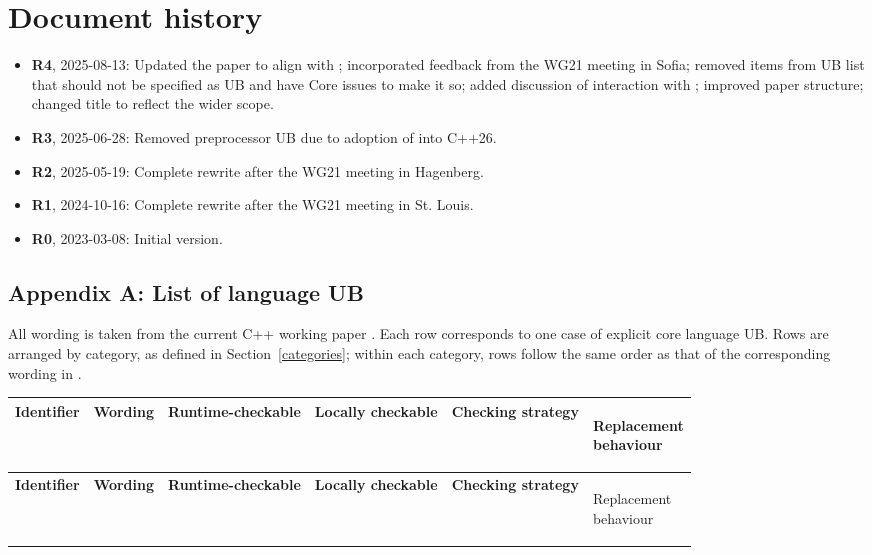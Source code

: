 {\section*{Document history}
\begin{itemize}
\item \textbf{R4}, 2025-08-13: Updated the paper to align with \cite{P3754R0}; incorporated feedback from the WG21 meeting in Sofia; removed items from UB list that should not be specified as UB and have Core issues to make it so; added discussion of interaction with ; improved paper structure; changed title to reflect the wider scope.
\item \textbf{R3}, 2025-06-28: Removed preprocessor UB due to adoption of \cite{P2843R3} into C++26.
\item \textbf{R2}, 2025-05-19: Complete rewrite after the WG21 meeting in Hagenberg.
\item \textbf{R1}, 2024-10-16: Complete rewrite after the WG21 meeting in St. Louis.
\item \textbf{R0}, 2023-03-08: Initial version.
\end{itemize}


\renewcommand{\addcontentsline}[3]{}%





\pagebreak
\begin{landscape}

\addcontentsline{toc}{section}{Appendix: UB list}
\section*{Appendix A: List of language UB}
\label{appendix}

All wording is taken from the current C++ working paper \cite{N5008}. Each row corresponds to one case of explicit core language UB. Rows are arranged by category, as defined in Section~\ref{categories}; within each category, rows follow the same order as that of the corresponding wording in \cite{N5008}.

\renewcommand\arraystretch{1.5}%
\begin{longtable}{|p{2.4cm}|p{6.5cm}|p{1.9cm}|p{1.9cm}|p{6.7cm}|p{2.5cm}|}
\hline
{\bfseries Identifier} & {\bfseries Wording} & {\bfseries Runtime-checkable} & {\bfseries Locally checkable} & {\bfseries Checking strategy} & {\bfseries\raggedright Replacement\\ behaviour}
\tabularnewline \hline
\endfirsthead
\hline
{\bfseries Identifier} & {\bfseries Wording} & {\bfseries Runtime-checkable} & {\bfseries Locally checkable} & {\bfseries Checking strategy} & {\bfseries\raggedright Replacement\\ behaviour}
\tabularnewline \hline
\endhead


\end{longtable}
\end{landscape}}

